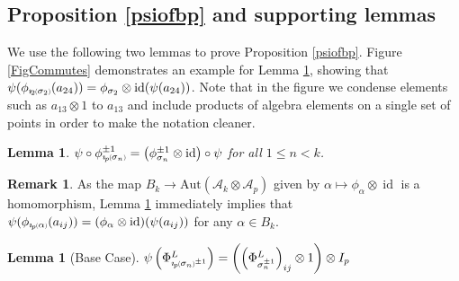 \documentclass[11pt]{amsart}
\def\A{{\mathcal A}}
\def\s{{\sigma}}
\def\fp{{\scriptstyle \bar{\bar{p}}}}
\newcommand*{\subsmallp}[1]{\scalebox{.5}{\ensuremath#1}}
\newcommand{\subpp}[2][p]{\imath_{\hspace*{-1pt}#1}\hspace*{-.5pt}\subsmallp(#2\subsmallp)}
\newcommand\id{\operatorname{id}}
\newtheorem{lem}[thm]{Lemma}
\theoremstyle{definition}
\newtheorem{rem}[thm]{Remark}
\begin{document}

\subsection{Proposition \ref{psiofbp} and supporting lemmas}
\label{PropAndLemmas}

\noindent We use the following two lemmas to prove Proposition \ref{psiofbp}.  Figure \ref{FigCommutes} demonstrates an example for Lemma \ref{commutes}, showing that $\psi(\phi_{\subpp[2]{\s_2}}(a_{24})) = \phi_{\s_2}\otimes\id(\psi(a_{24}))$.  Note that in the figure we condense elements such as $a_{13}\otimes 1$ to $a_{13}$ and include products of algebra elements on a single set of points in order to make the notation cleaner.


\begin{lem}\label{commutes}
$\psi\circ\phi^{\pm 1}_{\subpp{\s_n}} = \left(\phi^{\pm 1}_{\s_n}\otimes \id\right)\circ\psi$ for all $1\le n < k$.
\end{lem}

\begin{rem}As the map $B_{k} \to \text{Aut}(\A_k\otimes\A_p)$ given by $\alpha \mapsto \phi_\alpha\otimes\id$ is a homomorphism, Lemma \ref{commutes} immediately implies that $\psi(\phi_{\subpp\alpha}(a_{ij})) = (\phi_{\alpha} \otimes \id)(\psi(a_{ij}))$ for any $\alpha\in B_k$.
\end{rem}

\begin{lem}[Base Case]\label{basecase}
$\psi\left(\Phi_{\subpp{\s_n}^{\pm 1}}^L\right) = \left(\left(\Phi_{\s_n^{\pm 1}}^L\right)_{ij}\otimes 1\right)\otimes I_p$
\end{lem}
\end{document}
